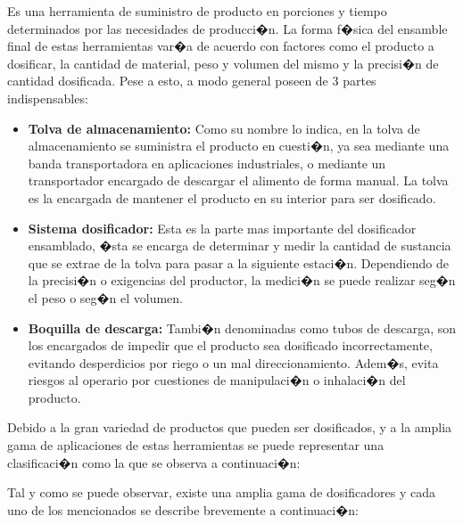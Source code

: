 Es una herramienta de suministro de producto en porciones y tiempo determinados por las necesidades de producci�n. La forma f�sica del ensamble final de estas herramientas var�a de acuerdo con factores como el producto a dosificar, la cantidad de material, peso y volumen del mismo y la precisi�n de cantidad dosificada. Pese a esto, a modo general poseen de 3 partes indispensables:
\begin{itemize}
\item \textbf{Tolva de almacenamiento:} Como su nombre lo indica, en la tolva de almacenamiento se suministra el producto en cuesti�n, ya sea mediante una banda transportadora en aplicaciones industriales, o mediante un transportador encargado de descargar el alimento de forma manual. La tolva es la encargada de mantener el producto en su interior para ser dosificado.
\item \textbf{Sistema dosificador:} Esta es la parte mas importante del dosificador ensamblado, �sta se encarga de determinar y medir la cantidad de sustancia que se extrae de la tolva para pasar a la siguiente estaci�n. Dependiendo de la precisi�n o exigencias del productor, la medici�n se puede realizar seg�n el peso o seg�n el volumen. 
\item \textbf{Boquilla de descarga:} Tambi�n  denominadas como tubos de descarga, son los encargados de impedir que el producto sea dosificado incorrectamente, evitando desperdicios por riego o un mal direccionamiento. Adem�s, evita riesgos al operario por cuestiones de manipulaci�n o inhalaci�n del producto.
\end{itemize}

Debido a la gran variedad de productos que pueden ser dosificados, y a la amplia gama de aplicaciones de estas herramientas se puede representar una clasificaci�n  como la que se observa a continuaci�n:


Tal y como se puede observar, existe una amplia gama de dosificadores y cada uno de los mencionados se describe brevemente a continuaci�n:

